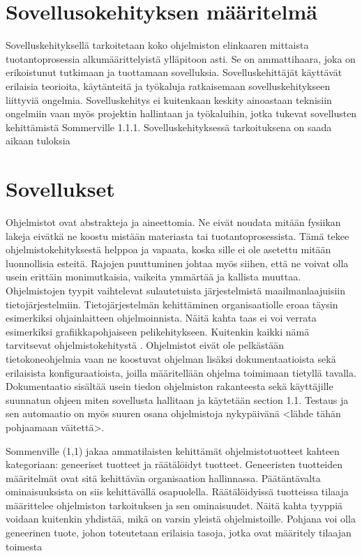 \documentclass[utf8]{gradu3}
\begin{document}
\section{Sovellusokehityksen määritelmä}
Sovelluskehityksellä tarkoitetaan koko ohjelmiston elinkaaren mittaista tuotantoprosessia alkumäärittelyistä ylläpitoon asti. Se on ammattihaara, joka on erikoistunut tutkimaan ja tuottamaan sovelluksia. Sovelluskehittäjät käyttävät erilaisia teorioita, käytänteitä ja työkaluja ratkaisemaan sovelluskehitykseen liittyviä ongelmia. Sovelluskehitys ei kuitenkaan keskity ainoastaan teknisiin ongelmiin vaan myös projektin hallintaan ja työkaluihin, jotka tukevat sovellusten kehittämistä {Sommerville 1.1.1}. Sovelluskehityksessä tarkoituksena on saada aikaan tuloksia 


\section{Sovellukset}
Ohjelmistot ovat abstrakteja ja aineettomia. Ne eivät noudata mitään fysiikan lakeja eivätkä ne koostu mistään materiasta tai tuotantoprosessista. Tämä tekee ohjelmistokehityksestä helppoa ja vapaata, koska sille ei ole asetettu mitään luonnollisia esteitä. Rajojen puuttuminen johtaa myös siihen, että ne voivat olla usein erittäin monimutkaisia, vaikeita ymmärtää ja kallista muuttaa. Ohjelmistojen tyypit vaihtelevat sulautetuista järjestelmistä maailmanlaajuisiin tietojärjestelmiin. Tietojärjestelmän kehittäminen organisaatiolle eroaa täysin esimerkiksi ohjainlaitteen ohjelmoinnista. Näitä kahta taas ei voi verrata esimerkiksi grafiikkapohjaiseen pelikehitykseen. Kuitenkin kaikki nämä tarvitsevat ohjelmistokehitystä \parencite{Sommenville}. Ohjelmistot eivät ole pelkästään tietokoneohjelmia vaan ne koostuvat ohjelman lisäksi dokumentaatioista sekä erilaisista konfiguraatioista, joilla määritellään ohjelma toimimaan tietyllä tavalla. Dokumentaatio sisältää usein tiedon ohjelmiston rakanteesta sekä käyttäjille suunnatun ohjeen miten sovellusta hallitaan ja käytetään \parencite{Sommerville} section 1.1. Testaus ja sen automaatio on myös suuren osana ohjelmistoja nykypäivänä <lähde tähän pohjaamaan väitettä>. 


Sommenville (1,1) jakaa ammatilaisten kehittämät ohjelmistotuotteet kahteen kategoriaan: geneeriset tuotteet ja räätälöidyt tuotteet. Geneeristen tuotteiden määritelmät ovat sitä kehittävän organisaation hallinnassa. Päätäntävalta ominaisuuksista on siis kehittävällä osapuolella. Räätälöidyissä tuotteissa tilaaja määrittelee ohjelmiston tarkoituksen ja sen ominaisuudet. Näitä kahta tyyppiä voidaan kuitenkin yhdistää, mikä on varsin yleistä ohjelmistoille. Pohjana voi olla geneerinen tuote, johon toteutetaan erilaisia tasoja, jotka ovat määritely tilaajan toimesta \parencite{Sommerville} 
\end{document}
